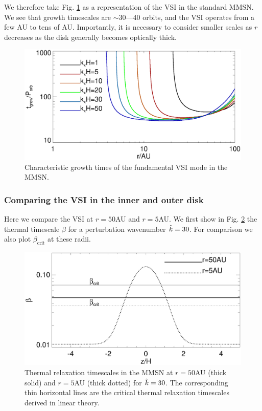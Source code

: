 We therefore take Fig. \ref{mmsn_overall} as a representation of the
VSI in the standard MMSN. We see that growth timescales are $\sim
30$---40 orbits, and the VSI operates from a few AU to tens of
AU. Importantly, it is necessary to consider smaller scales as $r$
decreases as the disk generally becomes optically thick.   

\begin{figure}
  \includegraphics[width=\linewidth]{figures/eigen_compare_grow.ps}
  \caption{Characteristic growth times of the fundamental VSI mode in
    the MMSN.  
    \label{mmsn_overall}}    
\end{figure}

\subsubsection{Comparing the VSI in the inner and outer disk} 
Here we compare the VSI at $r=50$AU and $r=5$AU. We first show in
Fig. \ref{beta_compare}  the thermal timescale $\beta$ for a
perturbation wavenumber $\hat{k}=30$. For comparison we also plot
$\beta_\mathrm{crit}$ at these radii.   

 \begin{figure}
  \includegraphics[width=\linewidth,clip=true,trim=0cm 0cm 0cm
  0cm]{figures/beta_compare}
  \caption{Thermal relaxation timescales in the MMSN at $r=50$AU
    (thick solid) and $r=5$AU (thick dotted) for $\hat{k}=30$. The
    corresponding thin horizontal lines are the critical thermal
    relaxation timescales derived in linear theory. 
    \label{beta_compare}}
\end{figure}

